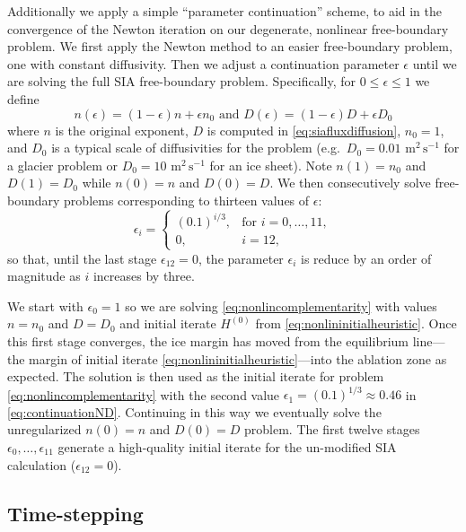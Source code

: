 \documentclass[review,letterpaper]{igs}
\newcommand\eps{\epsilon}
\begin{document}
Additionally we apply a simple ``parameter continuation'' scheme, to aid in the convergence of the Newton iteration on our degenerate, nonlinear free-boundary problem.  We first apply the Newton method to an easier free-boundary problem, one with constant diffusivity.  Then we adjust a continuation parameter $\eps$ until we are solving the full SIA free-boundary problem.  Specifically, for $0 \le \eps \le 1$ we define
\begin{equation}
n(\eps) = (1\!-\eps) n + \eps n_0 \text{ and } D(\eps) = (1\!-\eps) D + \eps D_0  \label{eq:continuationND}
\end{equation}
where $n$ is the original exponent, $D$ is computed in \eqref{eq:siafluxdiffusion}, $n_0=1$, and $D_0$ is a typical scale of diffusivities for the problem (e.g.~$D_0=0.01$ $\text{m}^2\,\text{s}^{-1}$ for a glacier problem or $D_0=10$ $\text{m}^2\,\text{s}^{-1}$ for an ice sheet).  Note $n(1)=n_0$ and $D(1)=D_0$ while $n(0)=n$ and $D(0)=D$.  We then consecutively solve free-boundary problems corresponding to thirteen values of $\eps$:
\begin{equation}
\eps_i = \begin{cases}
           (0.1)^{i/3}, & \text{for } i=0,\dots,11, \\
           0, & i=12,
         \end{cases}  \label{eq:continuationseq}
\end{equation}
so that, until the last stage $\eps_{12}=0$, the parameter $\eps_i$ is reduce by an order of magnitude as $i$ increases by three.

We start with $\eps_0=1$ so we are solving \eqref{eq:nonlincomplementarity} with values $n=n_0$ and $D=D_0$ and initial iterate $H^{(0)}$ from \eqref{eq:nonlininitialheuristic}.  Once this first stage converges, the ice margin has moved from the equilibrium line---the margin of initial iterate \eqref{eq:nonlininitialheuristic}---into the ablation zone as expected.  The solution is then used as the initial iterate for problem \eqref{eq:nonlincomplementarity} with the second value $\eps_1=(0.1)^{1/3}\approx 0.46$ in \eqref{eq:continuationND}.  Continuing in this way we eventually solve the unregularized $n(0)=n$ and $D(0)=D$ problem.  The first twelve stages $\eps_0,\dots,\eps_{11}$ generate a high-quality initial iterate for the un-modified SIA calculation ($\eps_{12}=0$). 


\subsection{Time-stepping}
\end{document}
